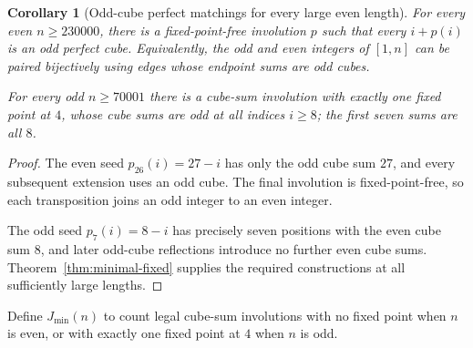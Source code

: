 \documentclass[10pt]{article}
\newtheorem{corollary}{Corollary}
\begin{document}
\begin{corollary}[Odd-cube perfect matchings for every large even length]
\label{cor:odd-cube-matching}
For every even $n\ge230000$, there
is a fixed-point-free involution
$p$ such that \emph{every}
$i+p(i)$ is an \emph{odd}
perfect cube. Equivalently,
the odd and even integers of
$[1,n]$ can be paired bijectively
using edges whose endpoint sums
are odd cubes.

For every odd $n\ge70001$
there is a cube-sum involution
with exactly one fixed point
at $4$, whose cube sums are
odd at \emph{all} indices
$i\ge8$; the first seven sums
are all $8$.
\end{corollary}
\begin{proof}
The even seed $p_{26}(i)=27-i$
has only the odd cube sum $27$,
and every subsequent extension
uses an odd cube. The final
involution is fixed-point-free,
so each transposition joins
an odd integer to an even
integer.

The odd seed $p_7(i)=8-i$
has precisely seven positions
with the even cube sum $8$,
and later odd-cube reflections
introduce no further even
cube sums. Theorem~\ref{thm:minimal-fixed}
supplies the required constructions
at all sufficiently large lengths.
\end{proof}

Define $J_{\min}(n)$ to count
legal cube-sum involutions
with no fixed point when $n$
is even, or with exactly one
fixed point at $4$ when $n$
is odd.
\end{document}
